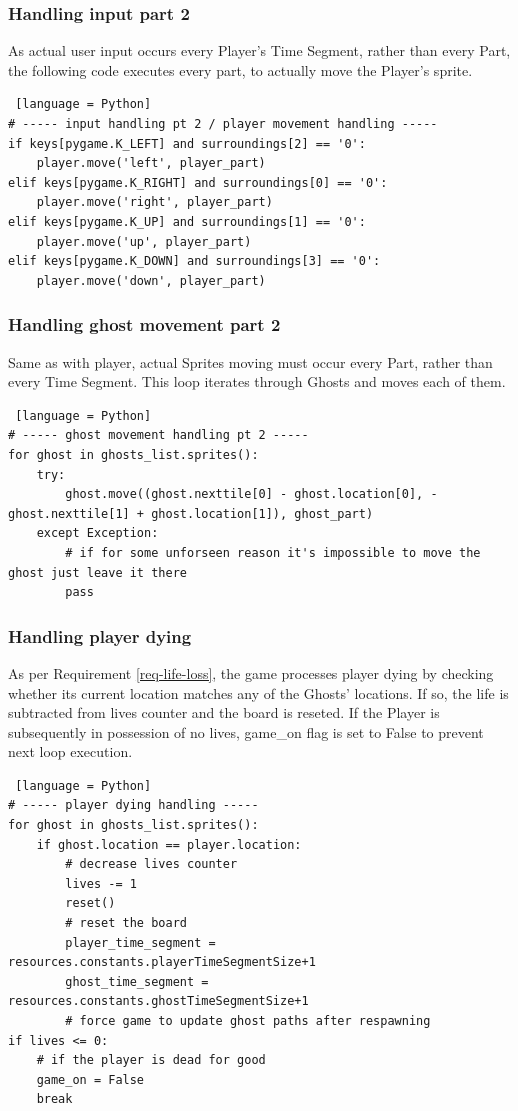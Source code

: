 \documentclass[11pt,a4paper]{report}
\begin{document}
				\subsubsection{Handling input part 2}
					As actual user input occurs every Player's Time Segment, rather than every Part, the following code executes every part, to actually move the Player's sprite.
					\begin{lstlisting} [language = Python]
# ----- input handling pt 2 / player movement handling -----
if keys[pygame.K_LEFT] and surroundings[2] == '0':
	player.move('left', player_part)
elif keys[pygame.K_RIGHT] and surroundings[0] == '0':
	player.move('right', player_part)
elif keys[pygame.K_UP] and surroundings[1] == '0':
	player.move('up', player_part)
elif keys[pygame.K_DOWN] and surroundings[3] == '0':
	player.move('down', player_part)
					\end{lstlisting}
				\subsubsection{Handling ghost movement part 2}
					Same as with player, actual Sprites moving must occur every Part, rather than every Time Segment. This loop iterates through Ghosts and moves each of them.
					\begin{lstlisting} [language = Python]
# ----- ghost movement handling pt 2 -----
for ghost in ghosts_list.sprites():
	try:
		ghost.move((ghost.nexttile[0] - ghost.location[0], -ghost.nexttile[1] + ghost.location[1]), ghost_part)
	except Exception:
		# if for some unforseen reason it's impossible to move the ghost just leave it there
		pass
					\end{lstlisting}
				\subsubsection{Handling player dying}
					As per Requirement \ref{req-life-loss}, the game processes player dying by checking whether its current location matches any of the Ghosts' locations. If so, the life is subtracted from lives counter and the board is reseted. If the Player is subsequently in possession of no lives, game\_on flag is set to False to prevent next loop execution.
					\begin{lstlisting} [language = Python]
# ----- player dying handling -----
for ghost in ghosts_list.sprites():
	if ghost.location == player.location:
		# decrease lives counter
		lives -= 1
		reset()
		# reset the board
		player_time_segment = resources.constants.playerTimeSegmentSize+1
		ghost_time_segment = resources.constants.ghostTimeSegmentSize+1
		# force game to update ghost paths after respawning
if lives <= 0:
	# if the player is dead for good
	game_on = False
	break
					\end{lstlisting}
\end{document}
